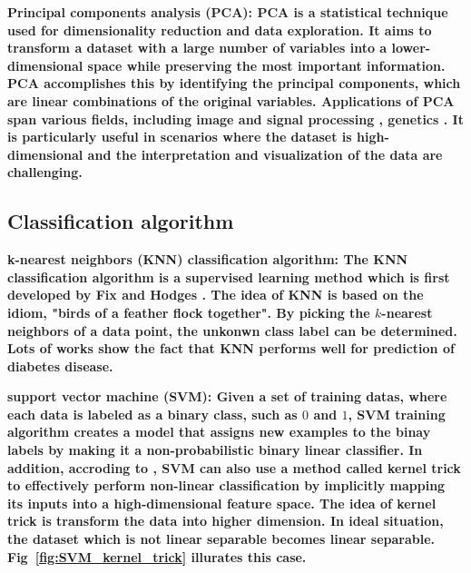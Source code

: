 \documentclass[twocolumn,10pt]{article}
\begin{document}
\bf{Principal components analysis (PCA)}: \rm{PCA} is a statistical technique used for dimensionality 
reduction and data exploration. It aims to transform a dataset with a large number of variables into 
a lower-dimensional space while preserving the most important information. PCA accomplishes this by 
identifying the principal components, which are linear combinations of the original variables. 
Applications of PCA span various fields, including image \cite{ma2019dimension} \cite{YANG20021997} 
and signal processing \cite{6497960} \cite{castells2007principal}, genetics \cite{reich2008principal} 
\cite{novembre2008interpreting}. It is particularly useful in scenarios where the dataset is 
high-dimensional and the interpretation and visualization of the data are challenging.

\subsection*{Classification algorithm}

\bf{k-nearest neighbors (KNN) classification algorithm}: \rm{The} KNN classification algorithm is a 
supervised learning method which is first developed by Fix and Hodges \cite{10.2307/1403797}. The idea 
of KNN is based on the idiom, "birds of a feather flock together". By picking the $k$-nearest neighbors 
of a data point, the unkonwn class label can be determined. Lots of works \cite{6528591} \cite{8276012} 
\cite{vijayan2014study} show the fact that KNN performs  well for prediction of diabetes disease.

\bf{support vector machine (SVM)}: \rm{Given} a set of training datas, where each data is labeled as a 
binary class, such as $0$ and $1$, SVM training algorithm creates a model that assigns new examples to 
the binay labels by making it a non-probabilistic binary linear classifier. In addition, accroding to 
\cite{amari1999improving} \cite{hofmann2006support}, SVM can also use a method called kernel trick to 
effectively perform non-linear classification by implicitly mapping its inputs into a high-dimensional 
feature space. 
The idea of kernel trick is transform the data into higher dimension. In ideal situation, the dataset 
which is not linear separable becomes linear separable. Fig~\ref{fig:SVM_kernel_trick} illurates this 
case. 
\end{document}
